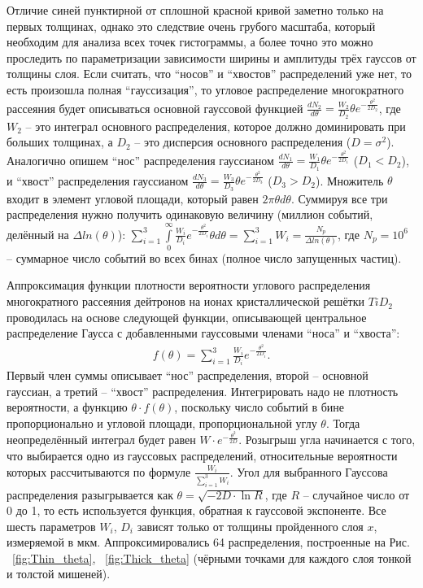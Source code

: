 \documentclass[a4paper,12pt]{article}
\begin{document}
\begin{large}
  Отличие синей пунктирной от сплошной красной кривой заметно только на первых толщинах, однако это следствие очень грубого масштаба, который необходим для анализа всех точек гистограммы, а более точно это можно проследить по параметризации зависимости ширины и амплитуды трёх гауссов от толщины слоя.
  Если считать, что ``носов'' и ``хвостов'' распределений уже нет, то есть произошла полная ``гауссизация'', то угловое распределение многократного рассеяния будет описываться основной гауссовой функцией $\frac{dN_2}{d\theta}=\frac{W_2}{D_2}\theta e^{-\frac{\theta^2}{2D_2}}$, где $W_2$ -- это интеграл основного распределения, которое должно доминировать при больших толщинах, а $D_2$ -- это дисперсия основного распределения ($D=\sigma^2$).
  Аналогично опишем ``нос'' распределения гауссианом $\frac{dN_1}{d\theta}=\frac{W_1}{D_1}\theta e^{-\frac{\theta^2}{2D_1}}$ ($D_1 < D_2$), и ``хвост'' распределения гауссианом $\frac{dN_3}{d\theta}=\frac{W_3}{D_3}\theta e^{-\frac{\theta^2}{2D_3}}$ ($D_3 > D_2$).
  Множитель $\theta$ входит в элемент угловой площади, который равен $2\pi \theta d\theta$.
  Суммируя все три распределения нужно получить одинаковую величину (миллион событий, делённый на $\Delta ln(\theta)$): $\sum_{i=1}^{3}\int \limits_0^{\infty} \frac{W_i}{D_i}e^{-\frac{\theta^2}{2D_i}}\theta d\theta=\sum_{i=1}^{3}W_i=\frac{N_p}{\Delta ln(\theta)}$, где $N_p=10^6$ -- суммарное число событий во всех бинах (полное число запущенных частиц).

Аппроксимация функции плотности вероятности углового распределения многократного рассеяния дейтронов на ионах кристаллической решётки $TiD_2$ проводилась на основе следующей функции, описывающей центральное распределение Гаусса с добавленными гауссовыми членами ``носа'' и ``хвоста'':
\begin{equation}
\label{MSApproximationFunction}
\begin{aligned} 
f(\theta)=\sum_{i=1}^{3} \frac{W_i}{D_i}e^{-\frac{\theta^2}{2D_i}}.
\end{aligned}
\end{equation}
  Первый член суммы описывает ``нос'' распределения, второй -- основной гауссиан, а третий --  ``хвост'' распределения.
  Интегрировать надо не плотность вероятности, а функцию $\theta\cdot f(\theta)$, поскольку число событий в бине пропорционально и угловой площади, пропорциональной углу $\theta$.
  Тогда неопределённый интеграл будет равен $W\cdot e^{-\frac{\theta^2}{2D}}$.
  Розыгрыш угла начинается с того, что выбирается одно из гауссовых распределений, относительные вероятности которых рассчитываются по формуле $\frac{W_i}{\sum_{i=1}^{3}W_i}$.
  Угол для выбранного Гауссова распределения разыгрывается как $\theta=\sqrt{-2D\cdot\ln{R}}$, где $R$ -- случайное число от 0 до 1, то есть используется функция, обратная к гауссовой экспоненте.
  Все шесть параметров $W_i$, $D_i$ зависят только от толщины пройденного слоя $x$, измеряемой в мкм.
  Аппроксимировались 64 распределения, построенные на Рис. ~\ref{fig:Thin_theta}, ~\ref{fig:Thick_theta} (чёрными точками для каждого слоя тонкой и толстой мишеней).


\end{large}
\end{document}
